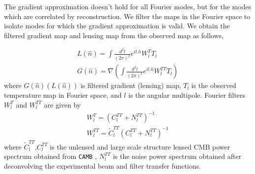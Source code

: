 The gradient approximation doesn't hold for all Fourier modes, but for the modes which are correlated by reconstruction.
We filter the maps in the Fourier space to isolate modes for which the gradient approximation is valid.
We obtain the filtered gradient map and lensing map from the observed map as follows,
 
  \begin{eqnarray}
  L(\hat{n}) = \int \frac{d^{2}l}{(2\pi)^{2}} e^{il .\hat{n}} W^{T}_{l} T_{l}\\
  G(\hat{n}) = \nabla (\int\frac{d^{2}l}{(2\pi)^{2}} e^{il .\hat{n}} W^{TT}_{l} T_{l}   )
  \label{grad_map}
  \end{eqnarray}
  where $G(\hat{n}) (L(\hat{n}))$ is filtered gradient (lensing) map, $T_{l}$ is the observed temperature map in Fourier space, and $l$ is the angular multipole.  
 Fourier filters $W^{T}_{l}$ and $W^{TT}_{l}$ are given by 
 \begin{eqnarray}
 W^{T}_{l} = (C^{TT}_{l} + N^{TT}_{l})^{-1}
 \label{eqn_filter1}\\
 W^{TT}_{l} =  \widetilde{C}^{TT}_{l}(C^{TT}_{l} + N^{TT}_{l})^{-1}
 \label{eqn_filters}
 \end{eqnarray}
 where $\widetilde{C}^{TT}_{l}$,$C^{TT}_{l}$ is the unlensed and large scale structure lensed CMB power spectrum obtained from \texttt{CAMB} \citep{lewis00}, $ N^{TT}_{l}$ is the noise power spectrum obtained after deconvolving the experimental beam and filter transfer functions.
 
